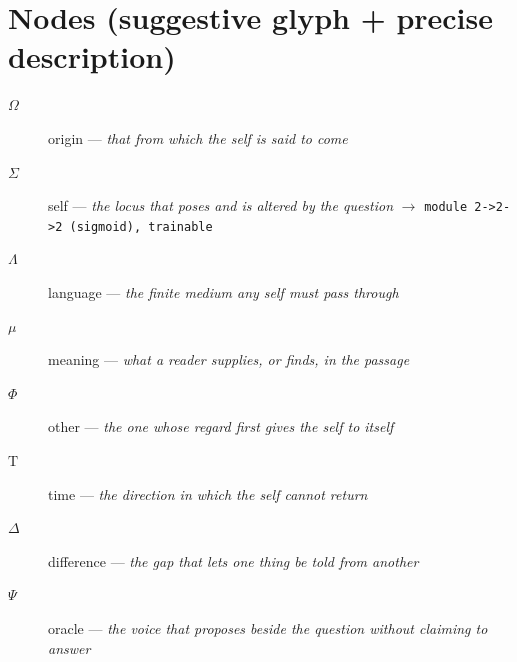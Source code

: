 \documentclass[11pt]{article}
\newcommand{\Tau}{\mathrm{T}}
\begin{document}
\section*{Nodes (suggestive glyph + precise description)}
\begin{description}\item[$ \Omega $] origin --- \emph{that from which the self is said to come}
\item[$ \Sigma $] self --- \emph{the locus that poses and is altered by the question} \quad $\rightarrow$ \texttt{module 2->2->2 (sigmoid), trainable}
\item[$ \Lambda $] language --- \emph{the finite medium any self must pass through}
\item[$ \mu $] meaning --- \emph{what a reader supplies, or finds, in the passage}
\item[$ \Phi $] other --- \emph{the one whose regard first gives the self to itself}
\item[$ \Tau $] time --- \emph{the direction in which the self cannot return}
\item[$ \Delta $] difference --- \emph{the gap that lets one thing be told from another}
\item[$ \Psi $] oracle --- \emph{the voice that proposes beside the question without claiming to answer}\end{description}
\end{document}

